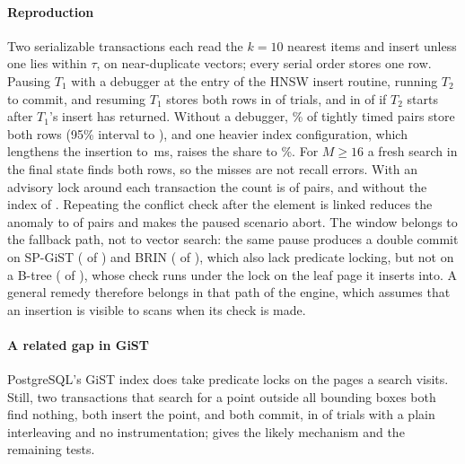 \documentclass[sigconf, nonacm, review]{acmart}
\begin{document}
\paragraph{Reproduction}
Two serializable transactions each read the $k=10$ nearest items and
insert unless one lies within $\tau$, on near-duplicate vectors; every
serial order stores one row. Pausing $T_1$ with a debugger at the entry
of the HNSW insert routine, running $T_2$ to commit, and resuming $T_1$
stores both rows in  of  trials, and
in  of  if $T_2$ starts after
$T_1$'s insert has returned. Without a debugger,
\% of  tightly timed
pairs store both rows (95\% interval  to
), and one heavier index configuration, which lengthens
the insertion to \,ms, raises the share to
\%. For $M\ge16$ a fresh search in the final
state finds both rows, so the misses are not recall errors. With an
advisory lock around each transaction the count is 
of  pairs, and without the index
 of . Repeating the
conflict check after the element is linked reduces the anomaly to
 of  pairs and
makes the paused scenario abort. The window belongs to the fallback
path, not to vector search: the same pause produces a double commit on
SP-GiST ( of ) and BRIN
( of ), which also lack
predicate locking, but not on a B-tree ( of
), whose check runs under the lock on the leaf
page it inserts into. A general remedy therefore belongs in that path
of the engine, which assumes that an insertion is visible to scans when
its check is made.

\paragraph{A related gap in GiST}
PostgreSQL's GiST index does take predicate locks on the pages a search
visits. Still, two transactions that search for a point outside all
bounding boxes both find nothing, both insert the point, and both
commit, in  of  trials with a plain
interleaving and no instrumentation; \appPG{} gives the likely
mechanism and the remaining tests.
\end{document}

